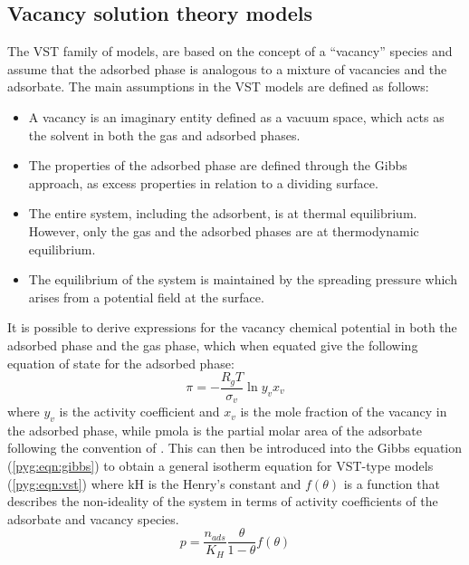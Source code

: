 \subsection{Vacancy solution theory models}\label{pyg:models:vst}

The \gls{VST} family of models,
are based on the concept of a “vacancy” species and
assume that the adsorbed phase is analogous to a mixture of
vacancies and the adsorbate. The main assumptions in the
\gls{VST} models are defined as follows:

\begin{itemize}

	\item A vacancy is an imaginary entity defined as a vacuum
	      space, which acts as the solvent in both the gas and adsorbed
	      phases.
	\item The properties of the adsorbed phase are defined through
	      the Gibbs approach, as excess properties in relation to
	      a dividing surface.
	\item The entire system, including the adsorbent, is at
	      thermal equilibrium. However, only the gas and the adsorbed
	      phases are at thermodynamic equilibrium.
	\item The equilibrium of the system is maintained by the
	      spreading pressure which arises from a potential field
	      at the surface.

\end{itemize}

It is possible to derive expressions for the vacancy chemical
potential in both the adsorbed phase and the gas phase, which when
equated give the following equation of state for the adsorbed phase:
%
\begin{equation}
	\pi = - \frac{R_g T}{\sigma_v} \ln{y_v x_v}
\end{equation}
%
where \(y_v\) is the activity coefficient and \(x_v\) is the mole
fraction of the vacancy in the adsorbed phase, while \gls{pmola}
is the partial molar area of the adsorbate following the 
convention of \citet{lucassen-reyndersSurfaceEquationState1972}. 
This can then be introduced into the Gibbs equation 
(\autoref{pyg:eqn:gibbs})
to obtain a general isotherm equation for \gls{VST}-type models
(\autoref{pyg:eqn:vst}) where \gls{kH} is the Henry’s constant and
\(f(\theta)\) is a function that describes the non-ideality of the
system in terms of activity coefficients of the adsorbate and
vacancy species.
%
\begin{equation}\label{pyg:eqn:vst}
	p = \frac{n_{ads}}{K_H} \frac{\theta}{1-\theta} f(\theta)
\end{equation}

